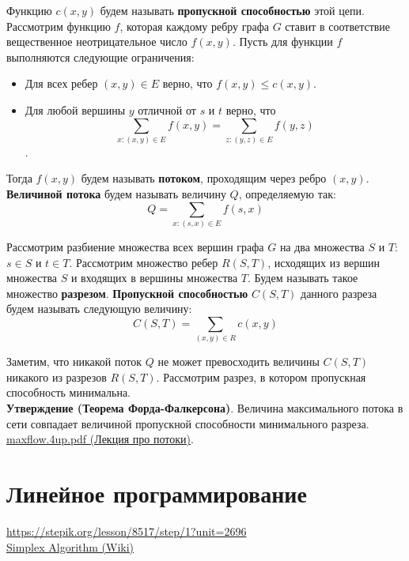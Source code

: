 \documentclass{article}
\begin{document}
Функцию $c(x, y)$ будем называть \textbf{пропускной способностью} этой цепи. \\

Рассмотрим функцию $f$, которая каждому ребру графа $G$ ставит в соответствие вещественное неотрицательное число $f(x, y)$. Пусть для функции $f$ выполняются следующие ограничения:

\begin{itemize}
	\item Для всех ребер $(x, y) \in E$ верно, что $f(x, y) \le c(x, y)$.
	\item Для любой вершины $y$ отличной от $s$ и $t$ верно, что $$\sum_{x : (x, y) \in E} f(x, y) = \sum_{z : (y, z) \in E} f(y, z)$$.
\end{itemize}  

Тогда $f(x, y)$ будем называть \textbf{потоком}, проходящим через ребро $(x, y)$. \textbf{Величиной потока} будем называть величину $Q$, определяемую так: $$Q = \sum_{x: (s, x) \in E} f(s, x) $$

Рассмотрим разбиение множества всех вершин графа $G$ на два множества $S$ и $T$: $s \in S$ и $t \in T$. Рассмотрим множество ребер $R(S, T)$, исходящих из вершин множества $S$ и входящих в вершины множества $T$. Будем называть такое множество \textbf{разрезом}. \textbf{Пропускной способностью} $C(S, T)$ данного разреза будем называть следующую величину: $$ C(S, T) = \sum_{(x, y) \in R} c(x, y) $$

Заметим, что никакой поток $Q$ не может превосходить величины $C(S, T)$ никакого из разрезов $R(S, T)$. Рассмотрим разрез, в котором пропускная способность минимальна. \\

\textbf{Утверждение (Теорема Форда-Фалкерсона)}. Величина максимального потока в сети совпадает величиной пропускной способности минимального разреза. \\

\href{https://www.cs.princeton.edu/courses/archive/spr04/cos226/lectures/maxflow.4up.pdf}{maxflow.4up.pdf (Лекция про потоки)}.

\section{Линейное программирование}

\href{https://stepik.org/lesson/8517/step/1?unit=2696}{https://stepik.org/lesson/8517/step/1?unit=2696} \\

\href{https://en.wikipedia.org/wiki/Simplex_algorithm}{Simplex Algorithm (Wiki)}
\end{document}
